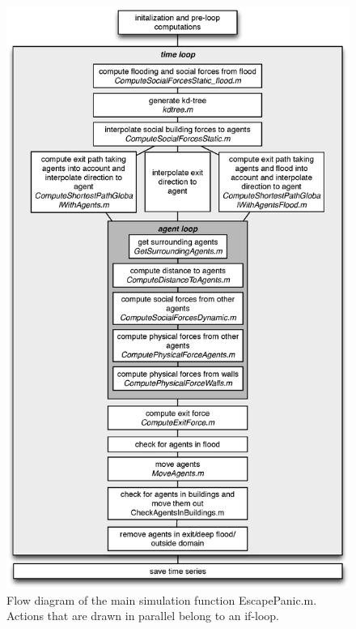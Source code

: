 \documentclass[11pt]{article}
\begin{document}
\begin{appendix}
\begin{figure}
\centering
\includegraphics[height=0.8\textheight]{figures/EscapePanic}
\caption{Flow diagram of the main simulation function EscapePanic.m. Actions that are drawn in parallel belong to an if-loop.}
\label{fig:EscapePanic}
\end{figure}


\end{appendix}
\end{document}
